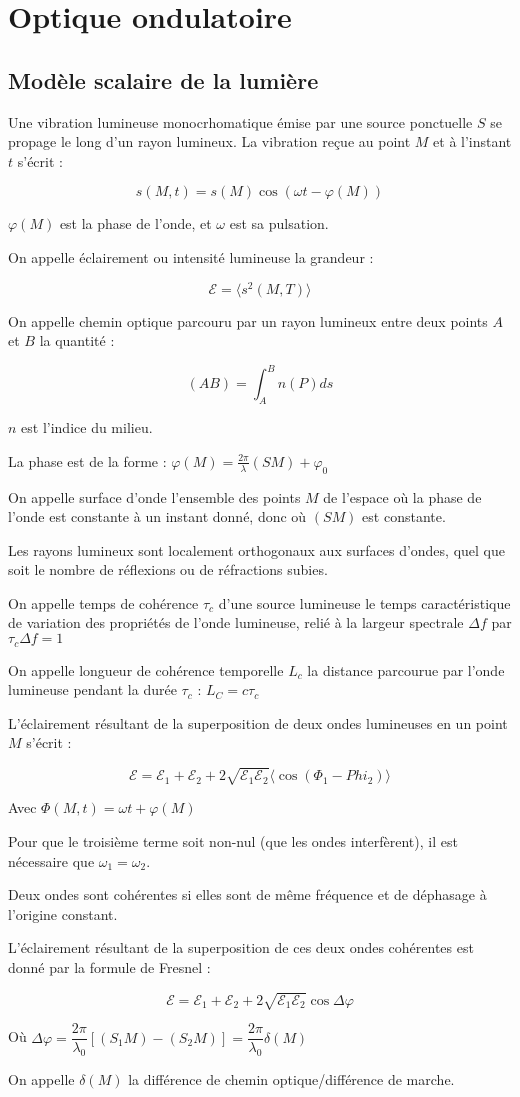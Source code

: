 \documentclass[a4paper,12pt]{book}
\newcommand{\Def}[2]{\begin{tcolorbox}[colback=white,colframe=red!10!green!20!blue!75!, title=Définition : #1]#2\end{tcolorbox}}
\newcommand{\Thr}[2]{\begin{tcolorbox}[sharp corners, colback=white,colframe=red!10!blue!30!green!75!, title=Théorème : #1]#2\end{tcolorbox}}
\begin{document}
\newpage
\section{Optique ondulatoire}
\subsection{Modèle scalaire de la lumière}
\Def{Rayon lumineux}{Une vibration lumineuse monocrhomatique émise par une source ponctuelle $S$ se propage le long d'un rayon lumineux. La vibration reçue au point $M$ et à l'instant $t$ s'écrit :
\par $$s(M,t) = s(M)\cos(\omega t -\varphi(M))$$
\par $\varphi(M)$ est la phase de l'onde, et $\omega$ est sa pulsation.
\par On appelle éclairement ou intensité lumineuse la grandeur :
\par $$\mathcal{E} = \langle s^2(M,T)\rangle$$
\par On appelle chemin optique parcouru par un rayon lumineux entre deux points $A$ et $B$ la quantité :
\par $$(AB) = \int_A^Bn(P)ds$$
\par $n$ est l'indice du milieu.
\par La phase est de la forme : $\varphi(M)=\frac{2\pi}{\lambda}(SM) +\varphi_0$
\par On appelle surface d'onde l'ensemble des points $M$ de l'espace où la phase de l'onde est constante à un instant donné, donc où $(SM)$ est constante.}
\Thr{Théorème de Malus}{Les rayons lumineux sont localement orthogonaux aux surfaces d'ondes, quel que soit le nombre de réflexions ou de réfractions subies.}
\Def{Cohérence}{On appelle temps de cohérence $\tau_c$ d'une source lumineuse le temps caractéristique de variation des propriétés de l'onde lumineuse, relié à la largeur spectrale $\Delta f$ par $\tau_c\Delta f=1$
\par On appelle longueur de cohérence temporelle $L_c$ la distance parcourue par l'onde lumineuse pendant la durée $\tau_c$ : $L_C = c\tau_c$}
\Thr{Formule de Fresnel}{L'éclairement résultant de la superposition de deux ondes lumineuses en un point $M$ s'écrit :
\par $$\mathcal{E}=\mathcal{E}_1+\mathcal{E}_2+2\sqrt{\mathcal{E}_1\mathcal{E}_2}\langle\cos(\Phi_1-Phi_2)\rangle$$
\par Avec $\Phi(M,t) = \omega t + \varphi(M)$
\par Pour que le troisième terme soit non-nul (que les ondes interfèrent), il est nécessaire que $\omega_1=\omega_2$.
\par Deux ondes sont cohérentes si elles sont de même fréquence et de déphasage à l'origine constant.
\par L'éclairement résultant de la superposition de ces deux ondes cohérentes est donné par la formule de Fresnel :
\par $$\mathcal{E} = \mathcal{E}_1 +\mathcal{E}_2+2\sqrt{\mathcal{E}_1\mathcal{E}_2}\cos\Delta\varphi$$
\par Où $\Delta\varphi =\dfrac{2\pi}{\lambda_0}[(S_1M)-(S_2M)]=\dfrac{2\pi}{\lambda_0}\delta(M)$
\par On appelle $\delta(M)$ la différence de chemin optique/différence de marche.}
\end{document}
